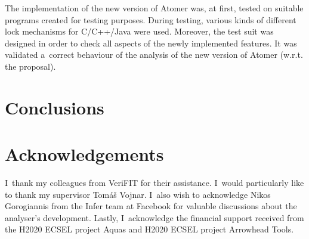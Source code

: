\documentclass{ExcelAtFIT}
\theoremstyle{definition}
\begin{document}
The implementation of the new version of Atomer was, at first, tested on suitable programs created for testing purposes. During testing, various kinds of different lock mechanisms for C/C++/Java were used. Moreover, the test suit was designed in order to check all aspects of the newly implemented features. It was validated a~correct behaviour of the analysis of the new version of Atomer (w.r.t. the proposal).



\section{Conclusions}
\label{sec:conc}



\section*{Acknowledgements}
I~thank my colleagues from VeriFIT for their assistance. I~would particularly like to thank my supervisor Tomáš Vojnar. I~also wish to acknowledge Nikos Gorogiannis from the Infer team at Facebook for valuable discussions about the analyser’s development. Lastly, I~acknowledge the financial support received from the H2020 ECSEL project Aquas and H2020 ECSEL project Arrowhead Tools.



\setlength{\bibsep}{.05em}
\apptocmd{\sloppy}{\hbadness 10000 \relax}{}{}



\end{document}
